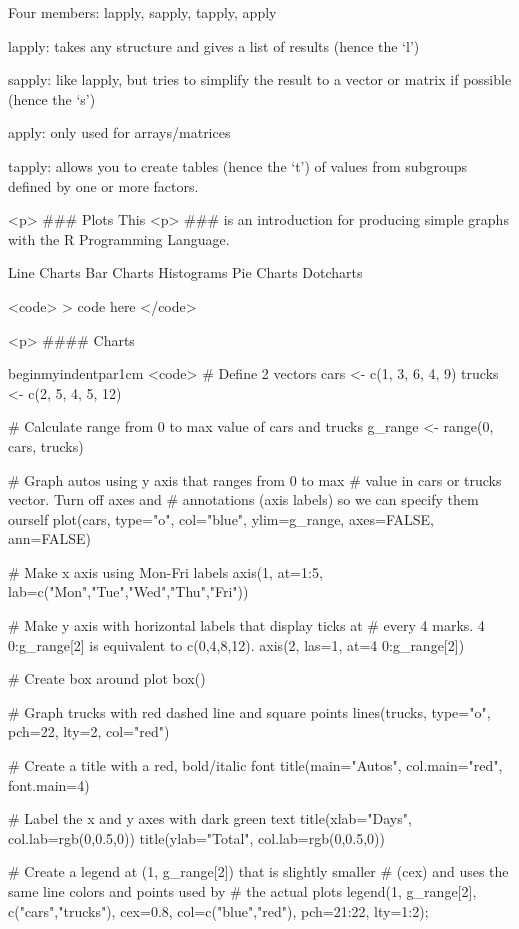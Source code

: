 Four members: lapply, sapply, tapply, apply

lapply: takes any structure and gives a list of results (hence
the `l')

sapply: like lapply, but tries to simplify the result to a
vector or matrix if possible (hence the `s')

apply: only used for arrays/matrices

tapply: allows you to create tables (hence the `t') of values
from subgroups defined by one or more factors.


<p>
### {Plots}
This <p>
###  is an introduction for producing simple graphs with
the R Programming Language.

Line Charts  Bar Charts Histograms Pie
Charts Dotcharts




      
      

 <code>
> code here
 </code>


<p>
#### { Charts}

begin{myindentpar}{1cm}
<code>
# Define 2 vectors cars <- c(1, 3, 6, 4, 9) trucks <- c(2, 5, 4,
5, 12)

# Calculate range from 0 to max value of cars and trucks g_range
<- range(0, cars, trucks)

# Graph autos using y axis that ranges from 0 to max # value in
cars or trucks vector.  Turn off axes and # annotations (axis
labels) so we can specify them ourself plot(cars, type="o",
col="blue", ylim=g_range,
   axes=FALSE, ann=FALSE)

# Make x axis using Mon-Fri labels axis(1, at=1:5,
lab=c("Mon","Tue","Wed","Thu","Fri"))

# Make y axis with horizontal labels that display ticks at # every
4 marks. 4     0:g_range[2] is equivalent to c(0,4,8,12). axis(2,
las=1, at=4     0:g_range[2])

# Create box around plot box()

# Graph trucks with red dashed line and square points
lines(trucks, type="o", pch=22, lty=2, col="red")

# Create a title with a red, bold/italic font title(main="Autos",
col.main="red", font.main=4)

# Label the x and y axes with dark green text title(xlab="Days",
col.lab=rgb(0,0.5,0)) title(ylab="Total", col.lab=rgb(0,0.5,0))

# Create a legend at (1, g_range[2]) that is slightly smaller #
(cex) and uses the same line colors and points used by # the
actual plots legend(1, g_range[2], c("cars","trucks"), cex=0.8,
   col=c("blue","red"), pch=21:22, lty=1:2);

